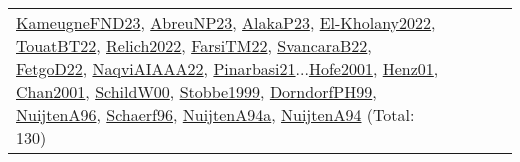 {\begin{longtable}{p{3cm}r>{\raggedright\arraybackslash}p{6cm}>{\raggedright\arraybackslash}p{6cm}>{\raggedright\arraybackslash}p{8cm}}
\hyperref[detail:KameugneFND23]{KameugneFND23}, \hyperref[detail:AbreuNP23]{AbreuNP23}, \hyperref[detail:AlakaP23]{AlakaP23}, \hyperref[detail:El-Kholany2022]{El-Kholany2022}, \hyperref[detail:TouatBT22]{TouatBT22}, \hyperref[detail:Relich2022]{Relich2022}, \hyperref[detail:FarsiTM22]{FarsiTM22}, \hyperref[detail:SvancaraB22]{SvancaraB22}, \hyperref[detail:FetgoD22]{FetgoD22}, \hyperref[detail:NaqviAIAAA22]{NaqviAIAAA22}, \hyperref[detail:Pinarbasi21]{Pinarbasi21}...\hyperref[detail:Hofe2001]{Hofe2001}, \hyperref[detail:Henz01]{Henz01}, \hyperref[detail:Chan2001]{Chan2001}, \hyperref[detail:SchildW00]{SchildW00}, \hyperref[detail:Stobbe1999]{Stobbe1999}, \hyperref[detail:DorndorfPH99]{DorndorfPH99}, \hyperref[detail:NuijtenA96]{NuijtenA96}, \hyperref[detail:Schaerf96]{Schaerf96}, \hyperref[detail:NuijtenA94a]{NuijtenA94a}, \hyperref[detail:NuijtenA94]{NuijtenA94} (Total: 130)\\
\end{longtable}
}

